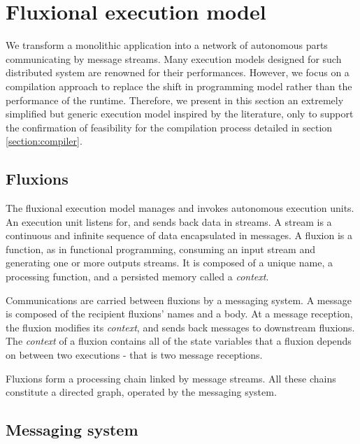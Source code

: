\section{Fluxional execution model} \label{section:model}

We transform a monolithic application into a network of autonomous parts communicating by message streams.
Many execution models designed for such distributed system are renowned for their performances\cite{Welsh2000, Jain2006, Wu2007, Zaharia2010, Akidau2013, Marz2011}.
However, we focus on a compilation approach to replace the shift in programming model rather than the performance of the runtime.
Therefore, we present in this section an extremely simplified but generic execution model inspired by the literature, only to support the confirmation of feasibility for the compilation process detailed in section \ref{section:compiler}.

\subsection{Fluxions}

The fluxional execution model manages and invokes autonomous execution units.
An execution unit listens for, and sends back data in streams.
A stream is a continuous and infinite sequence of data encapsulated in messages.
A fluxion is a function, as in functional programming, consuming an input stream and generating one or more outputs streams.
It is composed of a unique name, a processing function, and a persisted memory called a \textit{context}.

Communications are carried between fluxions by a messaging system.
A message is composed of the recipient fluxions' names and a body.
At a message reception, the fluxion modifies its \textit{context}, and sends back messages to downstream fluxions.
The \textit{context} of a fluxion contains all of the state variables that a fluxion depends on between two executions - that is two message receptions.

Fluxions form a processing chain linked by message streams.
All these chains constitute a directed graph, operated by the messaging system.

\subsection{Messaging system}

